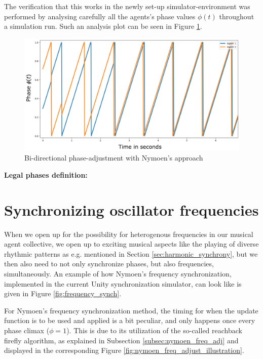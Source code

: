 		The verification that this works in the newly set-up simulator-environment was performed by analysing carefully all the agents's phase values $\phi(t)$ throughout a simulation run. Such an analysis plot can be seen in Figure \ref{fig:nymoen_phase}.
		
		\begin{figure}[h]
			\centering
			\includegraphics[width=0.9\linewidth]{Assets/DocSegments/Chapters/ExperimentsAndResults/Figures/Validations/KNymoenPhaseAdjustmentSecondTry.pdf}
			\caption[Illustration of Nymoen's bi-directional phase adjustment ($Adj_{\phi}$) method.]{Bi-directional phase-adjustment with Nymoen's approach}
			\label{fig:nymoen_phase}
		\end{figure}

	\textbf{Legal phases definition:} \nl

	 \nl
	
	
	
\section{Synchronizing oscillator frequencies}
\label{sec:frequency_methods}

	When we open up for the possibility for heterogenous frequencies in our musical agent collective, we open up to exciting musical aspects like the playing of diverse rhythmic patterns as e.g. mentioned in Section \ref{sec:harmonic_synchrony}, but we then also need to not only synchronize phases, but also frequencies, simultaneously. An example of how Nymoen's frequency synchronization, implemented in the current Unity synchronization simulator, can look like is given in Figure \ref{fig:frequency_synch}.
	
	For Nymoen's frequency synchronization method, the timing for when the update function is to be used and applied is a bit peculiar, and only happens once every phase climax ($\phi=1$). This is due to its utilization of the so-called reachback firefly algorithm, as explained in Subsection \ref{subsec:nymoen_freq_adj} and displayed in the corresponding Figure \ref{fig:nymoen_freq_adjust_illustration}.
	
